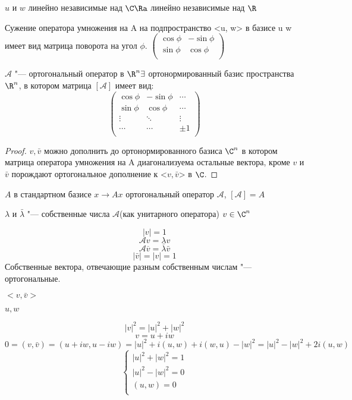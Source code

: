 $u$ и $w$ линейно независимые над $\C \Ra$ линейно независимые над $\R$

Сужение оператора умножения на A на подпространство <u, w> в базисе u w 
имеет вид матрица поворота на угол $\phi$. 
$\begin{pmatrix}
 \cos \phi& -\sin \phi\\
 \sin \phi & \cos \phi\\
\end{pmatrix}$

\begin{theorem}{}
$\mathscr{A}$ "---  ортогональный оператор в $\R^n \exists$ ортонормированный базис пространства $\R^n$, в котором 
матрица $[\mathscr{A}]$ имеет вид: 
$$\begin{pmatrix}
 \cos \phi & -\sin \phi & \cdots\\
 \sin \phi & \cos \phi & \cdots\\
 \vdots & \ddots & \vdots\\
 \cdots & \cdots & \pm 1\\
 \end{pmatrix}$$
\end{theorem}
\begin{proof}
$v, \bar v$ можно дополнить до ортонормированного базиса $\C^n$ в котором матрица оператора умножения на A  диагонализуема
остальные вектора, кроме $v$ и $\bar v$ порождают ортогональное дополнение к <$v, \bar v$> в $\C$. 
\end{proof}

$A$ в стандартном базисе $x \to Ax$ ортогональный оператор $\mathscr{A}$, $[\mathscr{A}] = A$

$\lambda$  и $\bar \lambda$ "--- собственные числа $\mathscr{A}$(как унитарного оператора) $v \in \C^n$

$$|v| = 1$$
$$\mathscr{A}v = \lambda v$$
$$\mathscr{A}\overline{v} = \bar \lambda \bar v$$
$$|\bar v| = |v| = 1$$
Собственные вектора, отвечающие разным собственным числам "--- ортогональные. 

$<v, \bar v>$

$u, w$

$$|v|^2 = |u|^2 + |w|^2$$
$$v = u + iw$$
$$0 = (v, \bar v) = (u + iw, u - iw) = |u|^2 + i(u, w) + i(w, u) - |w|^2 = |u|^2 - |w|^2 + 2i(u, w) $$
$$\left\{
\begin{aligned}
|u|^2 + |w|^2 = 1\\
|u|^2 - |w|^2 = 0\\
(u, w) = 0\\
\end{aligned}
\right.$$


